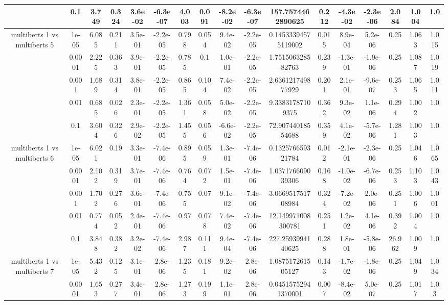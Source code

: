 \begin{tabular}{|c|c|c|c|c|c|c|c|c|c|c|c|c|c|c|c|c|}
 & 0.1 & 3.749 & 0.324 & 3.6e-02 & -6.3e-07 & 4.003 & 0.091 & -8.2e-02 & -6.3e-07 & 157.7574462890625 & 0.212 & -4.3e-02 & -2.3e-06 & 2.084 & 1.004 & 1.0 \\
\hline
\multirow{5}{*}{multiberts 1 vs multiberts 5} & 1e-05 & 6.085 & 0.211 & 3.5e-01 & -2.2e-05 & 0.798 & 0.054 & 9.4e-02 & -2.2e-05 & 0.14533394575119002 & 0.015 & 8.9e-04 & 5.2e-06 & 0.25 & 1.063 & 1.015 \\
 & 0.0001 & 2.225 & 0.363 & 3.9e-01 & -2.2e-05 & 0.785 & 0.1 & 1.0e-01 & -2.2e-05 & 1.751506328582763 & 0.239 & -1.3e-01 & -1.9e-06 & 0.25 & 1.087 & 1.019 \\
 & 0.001 & 1.689 & 0.314 & 3.8e-01 & -2.2e-05 & 0.865 & 0.104 & 7.4e-02 & -2.2e-05 & 2.636121749877929 & 0.201 & 2.1e-01 & -9.6e-07 & 0.253 & 1.065 & 1.011 \\
 & 0.01 & 0.685 & 0.026 & 2.3e-01 & -2.2e-05 & 1.361 & 0.058 & 5.0e-02 & -2.2e-05 & 9.33831787109375 & 0.362 & 9.3e-02 & 1.1e-06 & 0.294 & 1.002 & 1.0 \\
 & 0.1 & 3.604 & 0.326 & 2.9e-02 & -2.2e-05 & 1.455 & 0.056 & -6.6e-02 & -2.2e-05 & 72.90744018554688 & 0.359 & 4.1e-02 & -5.7e-06 & 1.281 & 1.003 & 1.0 \\
\hline
\multirow{5}{*}{multiberts 1 vs multiberts 6} & 1e-05 & 6.021 & 0.19 & 3.3e-01 & -7.4e-06 & 0.895 & 0.059 & 1.3e-01 & -7.4e-06 & 0.132576659321784 & 0.012 & -2.1e-01 & -2.3e-06 & 0.25 & 1.046 & 1.065 \\
 & 0.0001 & 2.102 & 0.319 & 3.7e-01 & -7.4e-06 & 0.764 & 0.072 & 1.5e-01 & -7.4e-06 & 1.037176609039306 & 0.168 & -1.0e-02 & -6.7e-06 & 0.253 & 1.103 & 1.043 \\
 & 0.001 & 1.702 & 0.276 & 3.6e-01 & -7.4e-06 & 0.755 & 0.07 & 9.1e-02 & -7.4e-06 & 3.066951751708984 & 0.324 & -7.2e-02 & 2.0e-06 & 0.251 & 1.006 & 1.001 \\
 & 0.01 & 0.774 & 0.052 & 2.4e-01 & -7.4e-06 & 0.97 & 0.078 & 7.4e-02 & -7.4e-06 & 12.149971008300781 & 0.251 & 1.2e-02 & 4.1e-06 & 0.392 & 1.004 & 1.0 \\
 & 0.1 & 3.848 & 0.382 & 3.2e-02 & -7.4e-06 & 2.987 & 0.111 & 9.4e-04 & -7.4e-06 & 227.2593994140625 & 0.288 & 1.8e-01 & -5.8e-06 & 26.962 & 1.009 & 1.0 \\
\hline
\multirow{5}{*}{multiberts 1 vs multiberts 7} & 1e-05 & 5.432 & 0.125 & 3.1e-01 & 2.8e-06 & 1.235 & 0.181 & 9.2e-02 & 2.8e-06 & 1.087517261505127 & 0.143 & -1.7e-02 & -1.8e-06 & 0.25 & 1.049 & 1.034 \\
 & 0.0001 & 1.653 & 0.277 & 3.4e-01 & 2.8e-06 & 1.273 & 0.199 & 1.1e-01 & 2.8e-06 & 0.04515752941370001 & 0.007 & -8.4e-02 & 5.0e-07 & 0.25 & 1.017 & 1.03 \\

\end{tabular}
